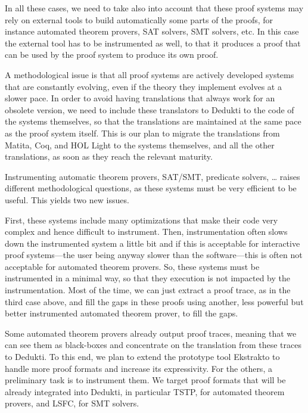 In all these cases, we need to take also into account that these proof
systems may rely on external tools to build automatically some parts
of the proofs, for instance automated theorem provers, SAT solvers,
SMT solvers, etc. In this case the external tool has to be
instrumented as well, to that it produces a proof that can be used by
the proof system to produce its own proof.

A methodological issue is that all proof systems are actively
developed systems that are constantly evolving, even if the theory
they implement evolves at a slower pace. In order to avoid having
translations that always work for an obsolete version, we need to
include these translators to Dedukti to the code of the systems
themselves, so that the translations are maintained at the same pace
as the proof system itself. This is our plan to migrate the
translations from Matita, Coq, and HOL Light to the systems
themselves, and all the other translations, as soon as they reach the
relevant maturity.


Instrumenting automatic theorem provers, SAT/SMT, predicate solvers,
\dots
raises different methodological questions, as these systems
must be very efficient to be useful. This yields two new issues.

First, these systems include many optimizations that make their code
very complex and hence difficult to instrument. Then, instrumentation
often slows down the instrumented system a little bit and if this is
acceptable for interactive proof systems---the user being anyway
slower than the software---this is often not acceptable for automated
theorem provers.
So, these systems must be instrumented in a minimal way, so that they
execution is not impacted by the instrumentation.  Most of the
time, we can just extract a proof trace, as in the third case above,
and fill the gaps in these proofs using another, less powerful but better
instrumented automated theorem prover, to fill the gaps.

Some automated theorem provers already output proof traces, meaning
that we can see them as black-boxes and concentrate on the translation
from these traces to Dedukti. To this end, we plan to extend the
prototype tool Ekstrakto to handle more proof formats and increase its
expressivity.
For the others, a preliminary task is to instrument them.  We target
proof formats that will be already integrated into Dedukti, in
particular TSTP, for automated theorem provers, and LSFC, for SMT solvers.


